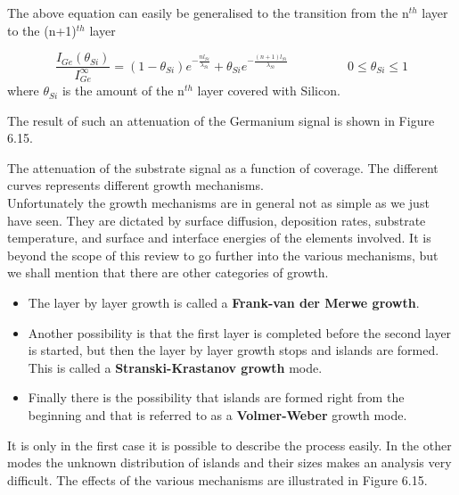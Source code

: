              The above equation  can  easily  be  generalised  to  the
          transition from the n$^{th}$ layer to the (n+1)$^{th}$ layer

          \begin{equation}
          \frac{I_{Ge}(\theta_{Si})}{I_{Ge}^{\infty}}                =
          (1-\theta_{Si})e^{-\frac{nl_{Si}}{\lambda_{Si}}}+\theta_{Si}e^{-\frac{(n+1)l_{Si}}{\lambda_{Si}}}
          \hspace{2cm} 0\leq \theta_{Si} \leq 1 \end{equation} where  $\theta_{Si}$
          is the amount of the n$^{th}$ layer covered with Silicon.

          The result of such an attenuation of the Germanium signal is
          shown in Figure 6.15.\\

          \vspace{9cm}

           The attenuation of the substrate
          signal as a  function  of  coverage.  The  different  curves
          represents different growth mechanisms.\\


          Unfortunately the growth mechanisms are in  general  not  as
          simple as we just have seen. They are  dictated  by  surface
          diffusion,  deposition  rates,  substrate  temperature,   and
          surface and interface energies of the elements involved.  It
          is beyond the scope of this review to go further into the
          various mechanisms, but we shall mention that there are
          other categories of growth.

            \begin{itemize}

          \item The layer by layer growth is called  a  {\bf  Frank-van  der
          Merwe growth}.

          \item Another possibility is that the first  layer  is  completed
          before the second layer is started, but then  the  layer  by
          layer growth stops and islands are formed. This is called  a
          {\bf Stranski-Krastanov growth} mode.

          \item Finally there is the possibility  that  islands  are  formed
          right from the beginning and that is referred to as  a  {\bf
          Volmer-Weber} growth mode.

                \end{itemize}
          It is only in the first case it is possible to describe  the
          process easily. In the other modes the unknown  distribution
          of islands and their sizes makes an analysis  very  difficult.
          The effects of the various  mechanisms  are  illustrated  in
          Figure 6.15.

